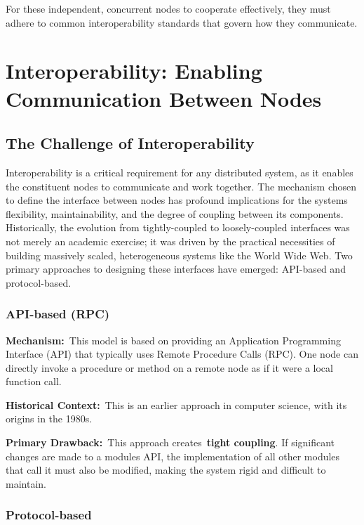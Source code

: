 \documentclass{scrbook}
\begin{document}
For these independent, concurrent nodes to cooperate effectively, they
must adhere to common interoperability standards that govern how they
communicate.

\section{Interoperability: Enabling Communication Between
Nodes}

\subsection{The Challenge of Interoperability}

Interoperability is a critical requirement for any distributed system,
as it enables the constituent nodes to communicate and work together.
The mechanism chosen to define the interface between nodes has profound
implications for the system\textquotesingle s flexibility,
maintainability, and the degree of coupling between its components.
Historically, the evolution from tightly-coupled to loosely-coupled
interfaces was not merely an academic exercise; it was driven by the
practical necessities of building massively scaled, heterogeneous
systems like the World Wide Web. Two primary approaches to designing
these interfaces have emerged: API-based and protocol-based.

\subsubsection{API-based (RPC)}

\textbf{Mechanism:}~This model is based on providing an Application
Programming Interface (API) that typically uses Remote Procedure Calls
(RPC). One node can directly invoke a procedure or method on a remote
node as if it were a local function call.

\textbf{Historical Context:}~This is an earlier approach in computer
science, with its origins in the 1980s.

\textbf{Primary Drawback:}~This approach creates~\textbf{tight
coupling}. If significant changes are made to a module\textquotesingle s
API, the implementation of all other modules that call it must also be
modified, making the system rigid and difficult to maintain.

\subsubsection{Protocol-based}
\end{document}
